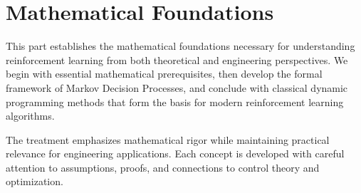 \part{Mathematical Foundations}

This part establishes the mathematical foundations necessary for understanding reinforcement learning from both theoretical and engineering perspectives. We begin with essential mathematical prerequisites, then develop the formal framework of Markov Decision Processes, and conclude with classical dynamic programming methods that form the basis for modern reinforcement learning algorithms.

The treatment emphasizes mathematical rigor while maintaining practical relevance for engineering applications. Each concept is developed with careful attention to assumptions, proofs, and connections to control theory and optimization.



